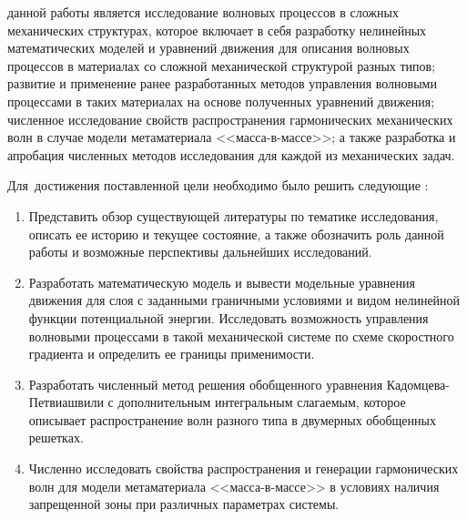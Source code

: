 
{\aim} данной работы является исследование волновых процессов в сложных механических структурах, которое включает в себя разработку нелинейных математических моделей и уравнений движения для описания волновых процессов в материалах со сложной механической структурой разных типов; развитие и применение ранее разработанных методов управления волновыми процессами в таких материалах на основе полученных уравнений движения; численное исследование свойств распространения гармонических механических волн в случае модели метаматериала <<масса-в-массе>>; а также разработка и апробация численных методов исследования для каждой из механических задач.

Для~достижения поставленной цели необходимо было решить следующие {\tasks}:
\begin{enumerate}[beginpenalty=10000] %
  \item {Представить обзор существующей литературы по тематике исследования, описать ее историю и текущее состояние, а также обозначить роль данной работы и возможные перспективы дальнейших исследований.}
  \item {Разработать математическую модель и вывести модельные уравнения движения для слоя с заданными граничными условиями и видом нелинейной функции потенциальной энергии. Исследовать возможность управления волновыми процессами в такой механической системе по схеме скоростного градиента и определить ее границы применимости.}
  \item {Разработать численный метод решения обобщенного уравнения Кадомцева-Петвиашвили с дополнительным интегральным слагаемым, которое описывает распространение волн разного типа в двумерных обобщенных решетках.}
  \item {Численно исследовать свойства распространения и генерации гармонических волн для модели метаматериала <<масса-в-массе>> в условиях наличия запрещенной зоны при различных параметрах системы.}
\end{enumerate}


